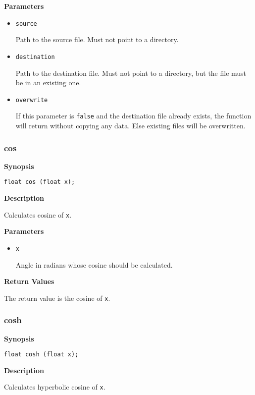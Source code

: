 \documentclass[a4paper, 10pt, titlepage]{article}
\begin{document}
\textbf{Parameters}

\begin{itemize}
\item \texttt{source}

Path to the source file. Must not point to a directory.

\item \texttt{destination}

Path to the destination file. Must not point to a directory, but the file must be in an existing one.

\item \texttt{overwrite}

If this parameter is \texttt{false} and the destination file already exists, the function will return without copying any data. Else existing files will be overwritten.
\end{itemize}

\subsubsection{cos}

\textbf{Synopsis}

\begin{verbatim}
float cos (float x);
\end{verbatim}

\textbf{Description}

Calculates cosine of \texttt{x}.

\textbf{Parameters}

\begin{itemize}
\item \texttt{x}

Angle in radians whose cosine should be calculated.
\end{itemize}

\textbf{Return Values}

The return value is the cosine of \texttt{x}.

\subsubsection{cosh}

\textbf{Synopsis}

\begin{verbatim}
float cosh (float x);
\end{verbatim}

\textbf{Description}

Calculates hyperbolic cosine of \texttt{x}.
\end{document}
